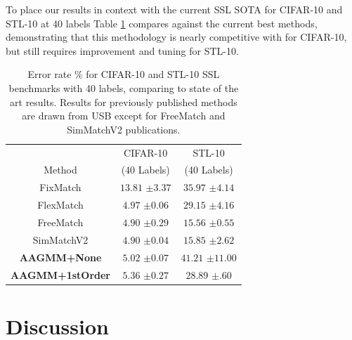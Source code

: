 \documentclass[10pt,twocolumn,letterpaper]{article}
\begin{document}
To place our results in context with the current SSL SOTA for CIFAR-10 and STL-10 at 40 labels Table \ref{sslcifar10} compares against the current best methods, demonstrating that this methodology is nearly competitive with for CIFAR-10, but still requires improvement and tuning for STL-10. 

\begin{table}[htbp]
	\begin{tabular}{c|cc}
		& CIFAR-10  &STL-10 \\ 
		Method & (40 Labels) & (40 Labels) \\
		\hline
		\hline
		FixMatch\cite{sohn2020fixmatch}   & $13.81$ \scriptsize{$\pm3.37$}   & $35.97$ \scriptsize{$\pm4.14$}     \\
		FlexMatch\cite{zhang2021flexmatch}  & $4.97$ \scriptsize{$\pm0.06$}    & $29.15$ \scriptsize{$\pm4.16$}    \\
		FreeMatch\cite{wang2022freematch}  & $4.90$ \scriptsize{$\pm0.29$}    & $15.56$ \scriptsize{$\pm0.55$}    \\
		SimMatchV2\cite{zheng2023simmatchv2} & $4.90$ \scriptsize{$\pm0.04$}    & $15.85$ \scriptsize{$\pm2.62$}    \\ \hline
		\textbf{AAGMM+None}    & $5.02$ \scriptsize{$\pm 0.07$}           & $41.21$ \scriptsize{$\pm11.00$}  \\
		\textbf{AAGMM+1stOrder}   & $5.36$ \scriptsize{$\pm 0.27$}           & $28.89$ \scriptsize{$\pm .60$}  
		
	\end{tabular}
	\caption{Error rate \% for CIFAR-10 and STL-10 SSL benchmarks with 40 labels, comparing to state of the art results. Results for previously published methods are drawn from USB \cite{wang2022usb} except for FreeMatch \cite{wang2022freematch} and SimMatchV2 \cite{zheng2023simmatchv2} publications.}
	\label{sslcifar10}
\end{table}



\section{Discussion}
\end{document}
